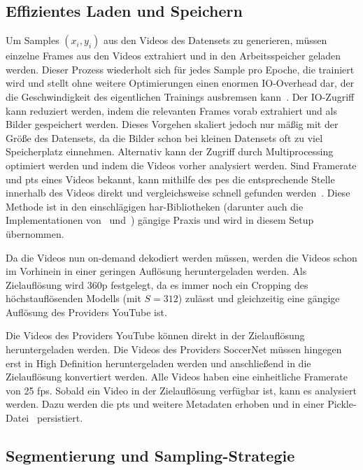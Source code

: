 \subsection{Effizientes Laden und Speichern}
\label{subsec:effiziente-speicherung}

Um Samples $(x_i, y_i)$ aus den Videos des Datensets zu generieren, müssen einzelne Frames aus den Videos extrahiert und in den Arbeitsspeicher geladen werden.
Dieser Prozess wiederholt sich für jedes Sample pro Epoche, die trainiert wird und stellt ohne weitere Optimierungen einen enormen IO-Overhead dar, der die Geschwindigkeit des eigentlichen Trainings ausbremsen kann~\cite{Wu20}.
Der IO-Zugriff kann \zB reduziert werden, indem die relevanten Frames vorab extrahiert und als Bilder gespeichert werden.
Dieses Vorgehen skaliert jedoch nur mäßig mit der Größe des Datensets, da die Bilder schon bei kleinen Datensets oft zu viel Speicherplatz einnehmen.
Alternativ kann der Zugriff durch Multiprocessing optimiert werden und indem die Videos vorher analysiert werden.
Sind Framerate und \gls{pts} eines Videos bekannt, kann mithilfe des \gls{pes} die entsprechende Stelle innerhalb des Videos direkt und vergleichsweise schnell gefunden werden~\cite{Fischer10}.
Diese Methode ist in den einschlägigen \gls{har}-Bibliotheken (darunter auch die Implementationen von~\cite{Feichtenhofer18} und~\cite{Wang19}) gängige Praxis und wird in diesem Setup übernommen.

Da die Videos nun on-demand dekodiert werden müssen, werden die Videos schon im Vorhinein in einer geringen Auflösung heruntergeladen werden.
Als Zielauflösung wird 360p festgelegt, da es immer noch ein Cropping des höchstauflösenden Modells (mit $S=312$) zulässt und gleichzeitig eine gängige Auflösung des Providers YouTube ist.

Die Videos des Providers YouTube können direkt in der Zielauflösung heruntergeladen werden.
Die Videos des Providers SoccerNet müssen hingegen erst in High Definition heruntergeladen werden und anschließend in die Zielauflösung konvertiert werden.
Alle Videos haben eine einheitliche Framerate von 25 \gls{fps}.
Sobald ein Video in der Zielauflösung verfügbar ist, kann es analysiert werden.
Dazu werden die \gls{pts} und weitere Metadaten erhoben und in einer Pickle-Datei~\cite{Lubanovic19} persistiert.

\subsection{Segmentierung und Sampling-Strategie}
\label{subsec:segmentierung-und-sampling-strategie}

